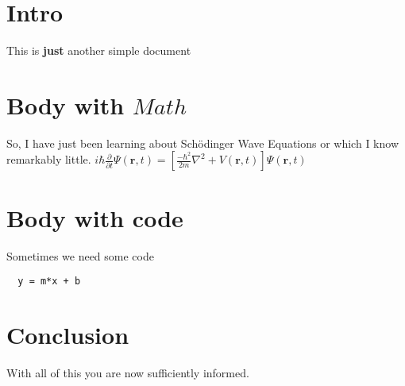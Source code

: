 \documentclass[%
  a4paper,
  10pt,
  version=last
]{scrartcl}
\begin{document}
  \section{Intro}
  This is \textbf{just} another simple document
  \section{Body with $Math$}
  So, I have just been learning about Sch\"odinger Wave Equations or which I
  know remarkably little.
  ${\displaystyle i\hbar {\frac {\partial }{\partial t}}\Psi (\mathbf {r} ,t)=\left[{\frac {-\hbar ^{2}}{2m}}\nabla ^{2}+V(\mathbf {r} ,t)\right]\Psi (\mathbf {r} ,t)}$
  \section{Body with code}
  Sometimes we need some code
  \begin{verbatim}
  y = m*x + b
  \end{verbatim}
  \section{Conclusion}
  With all of this you are now sufficiently informed.
\end{document}
